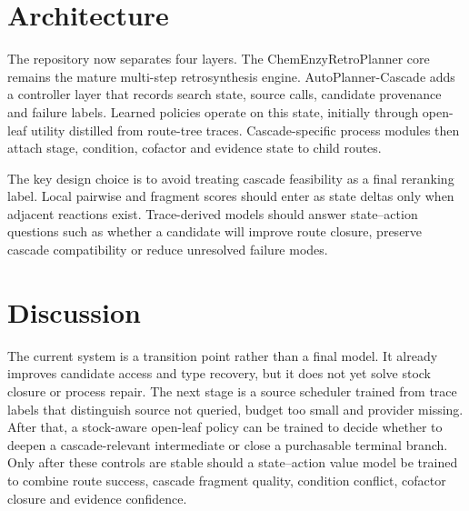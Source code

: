 \documentclass{nature}
\begin{document}
\section*{Architecture}
The repository now separates four layers. The ChemEnzyRetroPlanner core remains the mature multi-step retrosynthesis engine. AutoPlanner-Cascade adds a controller layer that records search state, source calls, candidate provenance and failure labels. Learned policies operate on this state, initially through open-leaf utility distilled from route-tree traces. Cascade-specific process modules then attach stage, condition, cofactor and evidence state to child routes.

The key design choice is to avoid treating cascade feasibility as a final reranking label. Local pairwise and fragment scores should enter as state deltas only when adjacent reactions exist. Trace-derived models should answer state--action questions such as whether a candidate will improve route closure, preserve cascade compatibility or reduce unresolved failure modes.

\section*{Discussion}
The current system is a transition point rather than a final model. It already improves candidate access and type recovery, but it does not yet solve stock closure or process repair. The next stage is a source scheduler trained from trace labels that distinguish source not queried, budget too small and provider missing. After that, a stock-aware open-leaf policy can be trained to decide whether to deepen a cascade-relevant intermediate or close a purchasable terminal branch. Only after these controls are stable should a state--action value model be trained to combine route success, cascade fragment quality, condition conflict, cofactor closure and evidence confidence.
\end{document}
